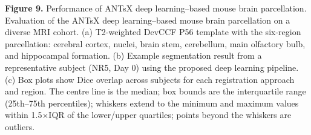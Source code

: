 \documentclass[
  12pt,
]{article}
\begin{document}
\textbf{Figure 9.} Performance of ANTsX deep learning--based mouse brain
parcellation. Evaluation of the ANTsX deep learning--based mouse brain
parcellation on a diverse MRI cohort. (a) T2-weighted DevCCF P56
template with the six-region parcellation: cerebral cortex, nuclei,
brain stem, cerebellum, main olfactory bulb, and hippocampal formation.
(b) Example segmentation result from a representative subject (NR5, Day
0) using the proposed deep learning pipeline. (c) Box plots show Dice
overlap across subjects for each registration approach and region. The
centre line is the median; box bounds are the interquartile range
(25th--75th percentiles); whiskers extend to the minimum and maximum
values within 1.5×IQR of the lower/upper quartiles; points beyond the
whiskers are outliers.
\end{document}
